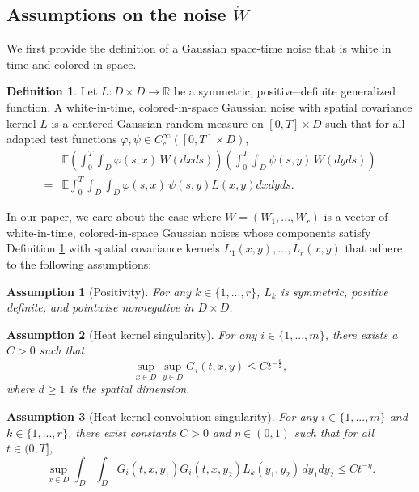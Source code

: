 \documentclass[12pt]{article}
\newtheorem{assumption}{Assumption}
\theoremstyle{definition}
\newtheorem{definition}{Definition}
\theoremstyle{remark}
\begin{document}
\subsection{Assumptions on the noise $\dot{W}$}
We first provide the definition of a Gaussian space-time noise that is white in time and colored in space.
\begin{definition}\label{def: space time noise}
    Let $L: D\times D\rightarrow \mathbb R$ be a symmetric, positive--definite generalized function. A white-in-time, colored-in-space Gaussian noise with spatial covariance kernel $L$ is a centered Gaussian random measure on $[0,T]\times D$ such that for all adapted test functions $\varphi,\psi\in C^{\infty}_c([0,T]\times D)$,
\begin{align*}\label{eq: space time noise}
&\mathbb{E}
\left(\int_0^T\int_D \varphi(s,x)\,W(dxds)\right)
\left(\int_0^T\int_D \psi(s,y)\,W(dyds)\right)
\\
=&\mathbb E\int_0^T\int_D\int_D
\varphi(s,x)\,\psi(s,y)L(x,y)dxdyds.
\end{align*}
\end{definition}
\noindent 
In our paper, we care about the case where $W=(W_1,...,W_r)$ is a vector of white-in-time, colored-in-space Gaussian noises whose components satisfy Definition \ref{def: space time noise} with spatial covariance kernels $L_1(x,y),...,L_r(x,y)$ that adhere to the following assumptions:
\begin{assumption}[Positivity]\label{assump: Posivitiy of kernel L}
    For any $k\in \{1,...,r\}$, $L_k$ is symmetric, positive definite, and pointwise nonnegative in $D\times D$.
\end{assumption} 
\begin{assumption}[Heat kernel singularity]\label{assump: heat kernel singularity}
    For any $i\in \{1,...,m\}$, there exists a $C>0$ such that 
   \begin{equation}\label{eq: heat kernel singularity}
       \sup_{x\in D}\sup_{y\in D} G_i(t,x,y) \leq Ct^{-\frac{d}{2}},
   \end{equation}
   where $d\geq 1$ is the spatial dimension.
\end{assumption}
\begin{assumption}[Heat kernel convolution singularity]\label{assump: convolution singularity}
    For any $i\in \{1,...,m\}$ and $k\in \{1,...,r\}$, there exist constants $C>0$ and $\eta\in(0,1)$ such that for all $t\in(0,T]$,
\begin{equation}\label{eq:L2}
\sup_{x\in D}\int_D\int_D G_i(t,x,y_1)G_i(t,x,y_2)L_k(y_1,y_2)\,dy_1dy_2
\le C t^{-\eta}.
\end{equation}
\end{assumption}
\end{document}
